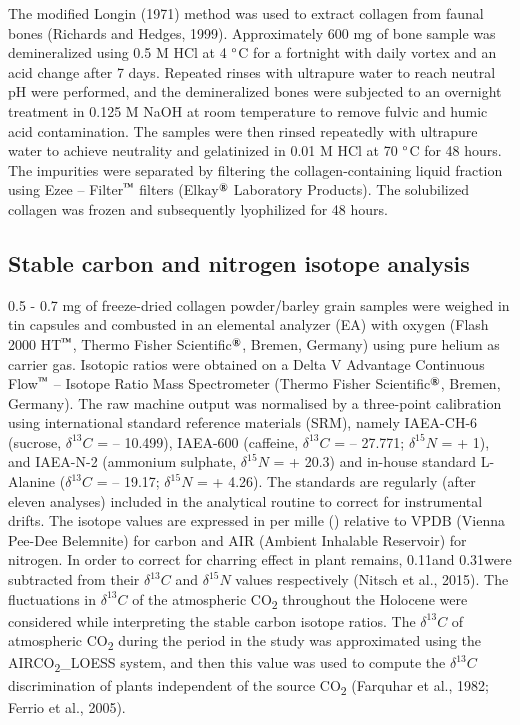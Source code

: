 \documentclass[5p]{elsarticle} %
\begin{document}
The modified Longin (1971) method was used to extract collagen from faunal bones (Richards and Hedges, 1999). Approximately 600 mg of bone sample was demineralized using 0.5 M HCl at 4 \(\text{\textdegree}\)C for a fortnight with daily vortex and an acid change after 7 days. Repeated rinses with ultrapure water to reach neutral pH were performed, and the demineralized bones were subjected to an overnight treatment in 0.125 M NaOH at room temperature to remove fulvic and humic acid contamination. The samples were then rinsed repeatedly with ultrapure water to achieve neutrality and gelatinized in 0.01 M HCl at 70 \(\text{\textdegree}\)C for 48 hours. The impurities were separated by filtering the collagen-containing liquid fraction using Ezee -- Filter\(^\text{\texttrademark}\) filters (Elkay\(^\text{\textregistered}\) Laboratory Products). The solubilized collagen was frozen and subsequently lyophilized for 48 hours.

\hypertarget{stable-carbon-and-nitrogen-isotope-analysis}{%
\subsection{Stable carbon and nitrogen isotope analysis}\label{stable-carbon-and-nitrogen-isotope-analysis}}

0.5 - 0.7 mg of freeze-dried collagen powder/barley grain samples were weighed in tin capsules and combusted in an elemental analyzer (EA) with oxygen (Flash 2000 HT\(^\text{\texttrademark}\), Thermo Fisher Scientific\(^\text{\textregistered}\), Bremen, Germany) using pure helium as carrier gas. Isotopic ratios were obtained on a Delta V Advantage Continuous Flow\(^\text{\texttrademark}\) -- Isotope Ratio Mass Spectrometer (Thermo Fisher Scientific\(^\text{\textregistered}\), Bremen, Germany). The raw machine output was normalised by a three-point calibration using international standard reference materials (SRM), namely IAEA-CH-6 (sucrose, \(\delta ^{13}C\) = -- 10.499\permil), IAEA-600 (caffeine, \(\delta ^{13}C\) = -- 27.771\permil; \(\delta ^{15}N\) = + 1\permil), and IAEA-N-2 (ammonium sulphate, \(\delta ^{15}N\) = + 20.3\permil) and in-house standard L-Alanine (\(\delta ^{13}C\) = -- 19.17\permil; \(\delta ^{15}N\) = + 4.26\permil). The standards are regularly (after eleven analyses) included in the analytical routine to correct for instrumental drifts. The isotope values are expressed in per mille (\permil) relative to VPDB (Vienna Pee-Dee Belemnite) for carbon and AIR (Ambient Inhalable Reservoir) for nitrogen. In order to correct for charring effect in plant remains, 0.11\permil and 0.31\permil were subtracted from their \(\delta ^{13}C\) and \(\delta ^{15}N\) values respectively (Nitsch et al., 2015). The fluctuations in \(\delta ^{13}C\) of the atmospheric CO\textsubscript{2} throughout the Holocene were considered while interpreting the stable carbon isotope ratios. The \(\delta ^{13}C\) of atmospheric CO\textsubscript{2} during the period in the study was approximated using the AIRCO\textsubscript{2}\_LOESS system, and then this value was used to compute the \(\delta ^{13}C\) discrimination of plants independent of the source CO\textsubscript{2} (Farquhar et al., 1982; Ferrio et al., 2005).
\end{document}

